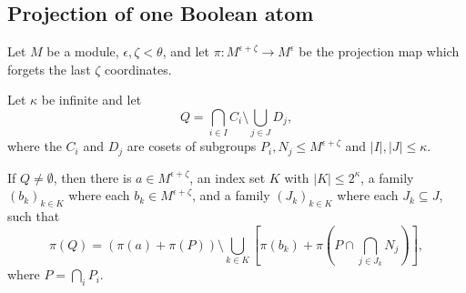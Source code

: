 \documentclass[11pt]{article}
\begin{document}
\subsection{Projection of one Boolean atom}

Let $M$ be a module, $\epsilon,\zeta < \theta$, and let $\pi: M^{\epsilon + \zeta} \to M^\epsilon$ be the projection map which forgets the last $\zeta$ coordinates.

\begin{lemma}
\label{lem:proj-atom}
    Let $\kappa$ be infinite and let 
    \[ Q = \bigcap_{i \in I} C_i \setminus \bigcup_{j \in J} D_j, \]
    where the $C_i$ and $D_j$ are cosets of subgroups $P_i, N_j \leq M^{\epsilon+ \zeta}$ and $|I|, |J| \leq \kappa$.
    
    If $Q \neq \emptyset$, then there is $a \in M^{\epsilon + \zeta}$, an index set $K$ with $|K| \leq 2^\kappa$, a family $(b_k)_{k \in K}$ where each $b_k \in M^{\epsilon + \zeta}$, and a family $(J_k)_{k \in K}$ where each $J_k \subseteq J$, such that 
    \[ 
        \pi(Q) = \left( \pi(a) + \pi(P) \right) \setminus \bigcup_{k \in K}  \left[ \pi(b_k) + \pi \left( P \cap \bigcap_{j \in J_k} N_j \right) \right],
    \]
    where $P = \bigcap_i P_i$.
\end{lemma}
\end{document}
